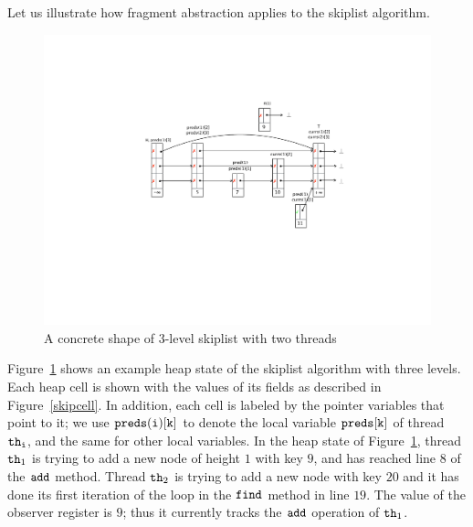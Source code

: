 Let us illustrate how fragment abstraction applies to the skiplist
algorithm.
\begin{figure}
\vspace*{-0.6cm}
\center  
 \includegraphics[width=1.2\textwidth, trim={7cm 8cm 0.5cm 6cm}, clip]{skipshape.pdf}  
\vspace*{-0.6cm}
 \caption{A concrete shape of 3-level skiplist with two threads}
\label{sl-shape}
\vspace*{-0.6cm}
\end{figure}
Figure~\ref{sl-shape} shows an example heap state of the
skiplist algorithm with three levels. Each heap cell is shown with the values of its fields as described in Figure~\ref{skipcell}. %
In addition, each cell is labeled by the
pointer variables that point to it; we use ${\tt preds(i)[k]}$ to denote the local
variable ${\tt preds[k]}$ of thread ${\tt th}_{\tt i}$, and the same for other local variables.
In the heap state of Figure~\ref{sl-shape}, thread ${\tt th}_1$ is trying to add a new node of height $1$ with key $9$, and has reached line $8$ of the $\tt add$ method. Thread ${\tt th}_2$ is trying to add a new node with key $20$ and it has done its first iteration of the loop in the $\tt find$ method in line $19$.
 The value of the observer register is $9$; thus it currently tracks the $\tt add$ operation of ${\tt th}_1$.




